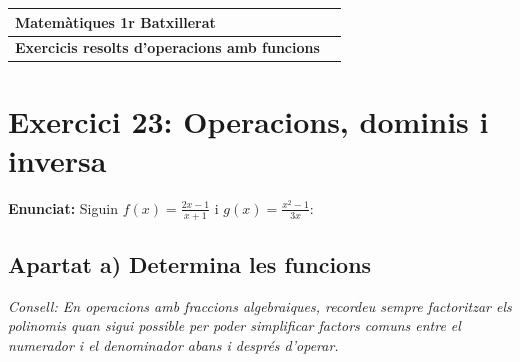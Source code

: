 \documentclass[12pt,a4paper]{article}
\begin{document}
\begingroup
\renewcommand{\arraystretch}{2.2}
\begin{tabularx}{\textwidth}{|X|p{4cm}|}
\hline
\textbf{Matemàtiques 1r Batxillerat}\\ \hline
\textbf{Exercicis resolts d'operacions amb funcions} \\ \hline
\end{tabularx}
\endgroup

\vspace{0.5cm}

\tableofcontents
\vspace{1cm}

\newpage

\section{Exercici 23: Operacions, dominis i inversa}

\textbf{Enunciat:} Siguin $f(x) = \frac{2x - 1}{x + 1}$ i $g(x) = \frac{x^2 - 1}{3x}$:

\subsection{Apartat a) Determina les funcions}

\textit{Consell: En operacions amb fraccions algebraiques, recordeu sempre factoritzar els polinomis quan sigui possible per poder simplificar factors comuns entre el numerador i el denominador abans i després d'operar.}
\end{document}
